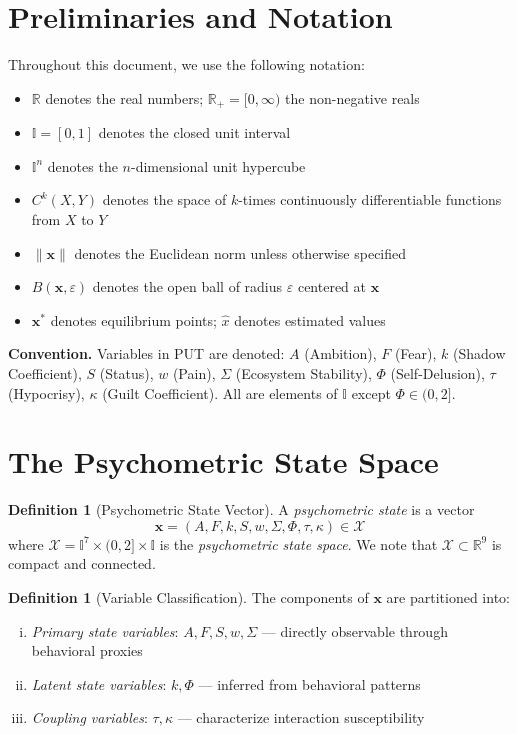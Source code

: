 \documentclass[12pt,a4paper]{article}
\theoremstyle{plain}
\theoremstyle{definition}
\newtheorem{definition}[theorem]{Definition}
\theoremstyle{remark}
\newcommand{\R}{\mathbb{R}}
\newcommand{\I}{\mathbb{I}}
\newcommand{\X}{\mathcal{X}}
\newcommand{\xstar}{\mathbf{x}^*}
\begin{document}
\section{Preliminaries and Notation}

Throughout this document, we use the following notation:

\begin{itemize}[nosep]
  \item $\R$ denotes the real numbers; $\R_+ = [0,\infty)$ the non-negative reals
  \item $\I = [0,1]$ denotes the closed unit interval
  \item $\I^n$ denotes the $n$-dimensional unit hypercube
  \item $C^k(X,Y)$ denotes the space of $k$-times continuously differentiable functions from $X$ to $Y$
  \item $\|\mathbf{x}\|$ denotes the Euclidean norm unless otherwise specified
  \item $B(\mathbf{x},\varepsilon)$ denotes the open ball of radius $\varepsilon$ centered at $\mathbf{x}$
  \item $\xstar$ denotes equilibrium points; $\hat{x}$ denotes estimated values
\end{itemize}

\textbf{Convention.} Variables in PUT are denoted: $A$ (Ambition), $F$ (Fear), $k$ (Shadow Coefficient), $S$ (Status), $w$ (Pain), $\Sigma$ (Ecosystem Stability), $\Phi$ (Self-Delusion), $\tau$ (Hypocrisy), $\kappa$ (Guilt Coefficient). All are elements of $\I$ except $\Phi \in (0,2]$.

\section{The Psychometric State Space}

\begin{definition}[Psychometric State Vector]
A \emph{psychometric state} is a vector
\[
\mathbf{x} = (A, F, k, S, w, \Sigma, \Phi, \tau, \kappa) \in \X
\]
where $\X = \I^7 \times (0,2] \times \I$ is the \emph{psychometric state space}. We note that $\X \subset \R^9$ is compact and connected.
\end{definition}

\begin{definition}[Variable Classification]
The components of $\mathbf{x}$ are partitioned into:
\begin{enumerate}[(i),nosep]
  \item \emph{Primary state variables}: $A, F, S, w, \Sigma$ --- directly observable through behavioral proxies
  \item \emph{Latent state variables}: $k, \Phi$ --- inferred from behavioral patterns
  \item \emph{Coupling variables}: $\tau, \kappa$ --- characterize interaction susceptibility
\end{enumerate}
\end{definition}
\end{document}
